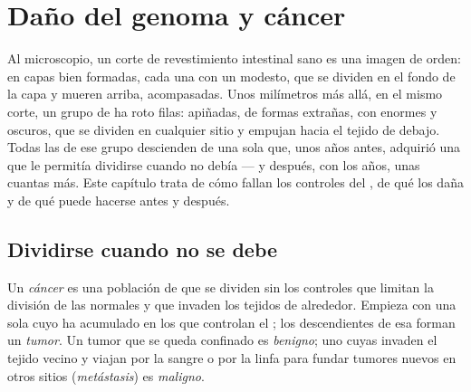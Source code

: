 \chapter{Daño del genoma y cáncer}\label{ch:g11:cancer}

Al microscopio, un corte de revestimiento intestinal sano es una imagen
de orden:  en capas bien formadas, cada una con un 
modesto, que se dividen en el fondo de la capa y mueren arriba,
acompasadas. Unos milímetros más allá, en el mismo corte, un grupo de
 ha roto filas: apiñadas, de formas extrañas, con 
enormes y oscuros, que se dividen en cualquier sitio y empujan hacia el
tejido de debajo. Todas las  de ese grupo descienden de una sola
que, unos años antes, adquirió una  que le permitía dividirse
cuando no debía --- y después, con los años, unas cuantas más. Este
capítulo trata de cómo fallan los controles del , de qué
los daña y de qué puede hacerse antes y después.

\section{Dividirse cuando no se debe}

\begin{definition}[Cáncer]\label{def:g11:cancer:cancer}
Un \emph{cáncer} es una población de  que se
dividen sin los controles que limitan la división de las 
normales y que invaden los tejidos de alrededor. Empieza con una sola
 cuyo  ha acumulado  en los  que controlan el
; los descendientes de esa  forman un
\emph{tumor}. Un tumor que se queda confinado es
\emph{benigno}; uno cuyas  invaden el tejido vecino y viajan por
la sangre o por la linfa para fundar tumores nuevos en otros sitios
(\emph{metástasis}) es \emph{maligno}.
\end{definition}

